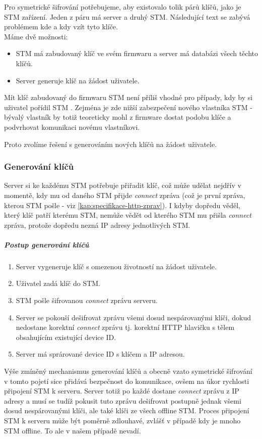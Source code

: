 Pro symetrické šifrování potřebujeme, aby existovalo tolik párů klíčů, jako je STM zařízení.
Jeden z páru má server a druhý STM.
Následující text se zabývá problémem kde a kdy vzít tyto klíče.
\\
Máme dvě možnosti:
\begin{itemize}
    \item STM má zabudovaný klíč ve svém firmwaru a server má databázi všech těchto klíčů.
    \item Server generuje klíč na žádost uživatele.
\end{itemize}

Mít klíč zabudovaný do firmwaru STM není příliš vhodné pro případy, kdy by si uživatel pořídil STM
.
Zejména je zde nižší zabezpečení nového vlastníka STM - bývalý vlastník by totiž teoreticky
mohl z firmware dostat podobu klíče a podvrhovat komunikaci novému vlastníkovi.

Proto zvolíme řešení s generováním nových klíčů na žádost uživatele.

\subsubsection{Generování klíčů}

Server si ke každému STM potřebuje přiřadit klíč, což může udělat nejdřív v momentě, kdy
mu od daného STM přijde \emph{connect} zpráva (což je první zpráva, kterou STM pošle - viz
\ref{kap:specifikace-http-zprav}).
I kdyby dopředu věděl, který klíč patří kterému STM, nemůže vědět od kterého STM mu přišla
\emph{connect} zpráva, protože dopředu nezná IP adresy jednotlivých STM.

\subparagraph{Postup generování klíčů}
\begin{enumerate}
    \item Server vygeneruje klíč s omezenou životností na žádost uživatele.
    \item Uživatel zadá klíč do STM.
    \item STM pošle šifrovanou \emph{connect} zprávu serveru.
    \item Server se pokouší dešifrovat zprávu všemi dosud nespárovanými klíči, dokud nedostane korektní
        \emph{connect} zprávu tj. korektní HTTP hlavičku s tělem obsahujícím existující device ID.
    \item Server má sprárované device ID s klíčem a IP adresou.
\end{enumerate}

Výše zmíněný mechanismus generování klíčů a obecně vzato symetrické šifrování v tomto pojetí sice
přidává bezpečnost do komunikace, ovšem na úkor rychlosti připojení STM k serveru.
Server totiž po každé dostane \emph{connect} zprávu z  IP adresy a musí se tudíž
pokusit tuto zprávu dešifrovat postupně jednak všemi dosud nespárovanými klíči, ale také klíči
ze všech offline STM.
Proces připojení STM k serveru může být poměrně zdlouhavé, zvlášť v případě kdy je mnoho
STM offline.
To ale v našem případě nevadí.
